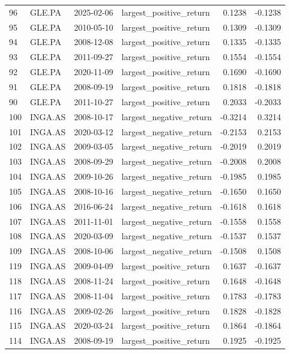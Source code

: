 \begin{table}
\begin{tabular}{llllrr}
96 & GLE.PA & 2025-02-06 & largest_positive_return & 0.1238 & -0.1238 \\
95 & GLE.PA & 2010-05-10 & largest_positive_return & 0.1309 & -0.1309 \\
94 & GLE.PA & 2008-12-08 & largest_positive_return & 0.1335 & -0.1335 \\
93 & GLE.PA & 2011-09-27 & largest_positive_return & 0.1554 & -0.1554 \\
92 & GLE.PA & 2020-11-09 & largest_positive_return & 0.1690 & -0.1690 \\
91 & GLE.PA & 2008-09-19 & largest_positive_return & 0.1818 & -0.1818 \\
90 & GLE.PA & 2011-10-27 & largest_positive_return & 0.2033 & -0.2033 \\
100 & INGA.AS & 2008-10-17 & largest_negative_return & -0.3214 & 0.3214 \\
101 & INGA.AS & 2020-03-12 & largest_negative_return & -0.2153 & 0.2153 \\
102 & INGA.AS & 2009-03-05 & largest_negative_return & -0.2019 & 0.2019 \\
103 & INGA.AS & 2008-09-29 & largest_negative_return & -0.2008 & 0.2008 \\
104 & INGA.AS & 2009-10-26 & largest_negative_return & -0.1985 & 0.1985 \\
105 & INGA.AS & 2008-10-16 & largest_negative_return & -0.1650 & 0.1650 \\
106 & INGA.AS & 2016-06-24 & largest_negative_return & -0.1618 & 0.1618 \\
107 & INGA.AS & 2011-11-01 & largest_negative_return & -0.1558 & 0.1558 \\
108 & INGA.AS & 2020-03-09 & largest_negative_return & -0.1537 & 0.1537 \\
109 & INGA.AS & 2008-10-06 & largest_negative_return & -0.1508 & 0.1508 \\
119 & INGA.AS & 2009-04-09 & largest_positive_return & 0.1637 & -0.1637 \\
118 & INGA.AS & 2008-11-24 & largest_positive_return & 0.1648 & -0.1648 \\
117 & INGA.AS & 2008-11-04 & largest_positive_return & 0.1783 & -0.1783 \\
116 & INGA.AS & 2009-02-26 & largest_positive_return & 0.1828 & -0.1828 \\
115 & INGA.AS & 2020-03-24 & largest_positive_return & 0.1864 & -0.1864 \\
114 & INGA.AS & 2008-09-19 & largest_positive_return & 0.1925 & -0.1925 \\

\end{tabular}
\end{table}
